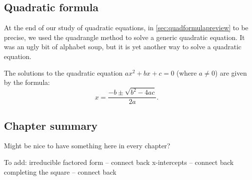 \subsection{Quadratic formula}

At the end of our study of quadratic equations, in \cref{sec:quadformulapreview} to be precise, we used the quadrangle method to solve a generic quadratic equation. It was an ugly bit of alphabet soup, but it is yet another way to solve a quadratic equation.

\begin{boxeddef}
The solutions to the quadratic equation $ax^2 + bx + c=0$ (where $a\neq0$) are given by the formula:
\[x=\frac{-b\pm\sqrt{b^2-4ac}}{2a}.\]
\end{boxeddef}


%
%
%
%
%
%
%
%
%
%
%
%
%
%
%
%
%
%
%

\subsection*{Chapter summary}

Might be nice to have something here in every chapter?


To add:
irreducible
factored form -- connect back
x-intercepts -- connect back
completing the square -- connect back
